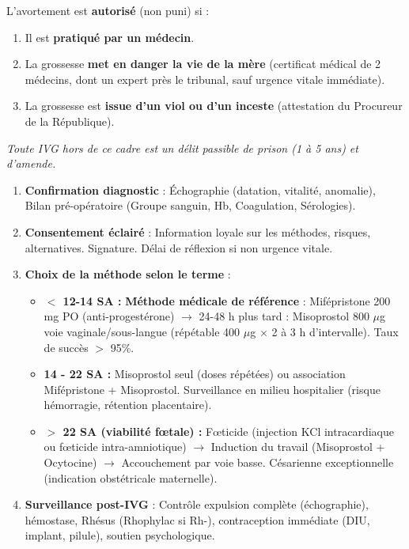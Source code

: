 \documentclass[11pt]{article}
\begin{document}
\begin{propriete}
L'avortement est \textbf{autorisé} (non puni) si :
\begin{enumerate}
    \item Il est \textbf{pratiqué par un médecin}.
    \item La grossesse \textbf{met en danger la vie de la mère} (certificat médical de 2 médecins, dont un expert près le tribunal, sauf urgence vitale immédiate).
    \item La grossesse est \textbf{issue d'un viol ou d'un inceste} (attestation du Procureur de la République).
\end{enumerate}
\emph{Toute IVG hors de ce cadre est un délit passible de prison (1 à 5 ans) et d'amende.}
\end{propriete}

\begin{methode}
\begin{enumerate}
    \item \textbf{Confirmation diagnostic} : Échographie (datation, vitalité, anomalie), Bilan pré-opératoire (Groupe sanguin, Hb, Coagulation, Sérologies).
    \item \textbf{Consentement éclairé} : Information loyale sur les méthodes, risques, alternatives. Signature. Délai de réflexion si non urgence vitale.
    \item \textbf{Choix de la méthode selon le terme} :
    \begin{itemize}
        \item \textbf{$<$ 12-14 SA :} \textbf{Méthode médicale de référence} : Mifépristone 200 mg PO (anti-progestérone) $\rightarrow$ 24-48 h plus tard : Misoprostol 800 $\mu$g voie vaginale/sous-langue (répétable 400 $\mu$g $\times$ 2 à 3 h d'intervalle). Taux de succès $>$ 95\%.
        \item \textbf{14 - 22 SA :} Misoprostol seul (doses répétées) ou association Mifépristone + Misoprostol. Surveillance en milieu hospitalier (risque hémorragie, rétention placentaire).
        \item \textbf{$>$ 22 SA (viabilité fœtale) :} Fœticide (injection KCl intracardiaque ou fœticide intra-amniotique) $\rightarrow$ Induction du travail (Misoprostol + Ocytocine) $\rightarrow$ Accouchement par voie basse. Césarienne exceptionnelle (indication obstétricale maternelle).
    \end{itemize}
    \item \textbf{Surveillance post-IVG} : Contrôle expulsion complète (échographie), hémostase, Rhésus (Rhophylac si Rh-), contraception immédiate (DIU, implant, pilule), soutien psychologique.
\end{enumerate}
\end{methode}
\end{document}
